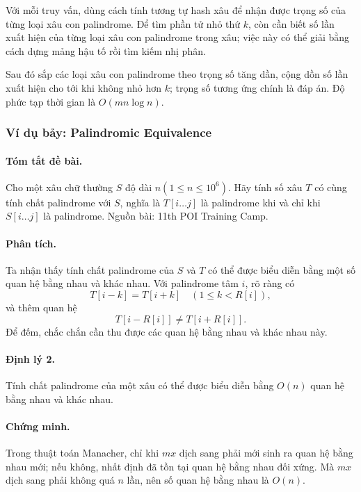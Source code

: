 \documentclass[11pt]{article}
\begin{document}
Với mỗi truy vấn, dùng cách tính tương tự hash xâu để nhận được trọng số của
từng loại xâu con palindrome. Để tìm phần tử nhỏ thứ \(k\), còn cần biết số lần
xuất hiện của từng loại xâu con palindrome trong xâu; việc này có thể giải
bằng cách dựng mảng hậu tố rồi tìm kiếm nhị phân.

Sau đó sắp các loại xâu con palindrome theo trọng số tăng dần, cộng dồn số lần
xuất hiện cho tới khi không nhỏ hơn \(k\); trọng số tương ứng chính là đáp án.
Độ phức tạp thời gian là \(O(mn\log n)\).

\subsubsection{Ví dụ bảy: Palindromic Equivalence}

\paragraph{Tóm tắt đề bài.}
Cho một xâu chữ thường \(S\) độ dài \(n(1\le n\le10^6)\). Hãy tính số xâu \(T\)
có cùng tính chất palindrome với \(S\), nghĩa là \(T[i\ldots j]\) là palindrome
khi và chỉ khi \(S[i\ldots j]\) là palindrome. Nguồn bài: 11th POI Training
Camp.

\paragraph{Phân tích.}
Ta nhận thấy tính chất palindrome của \(S\) và \(T\) có thể được biểu diễn bằng
một số quan hệ bằng nhau và khác nhau. Với palindrome tâm \(i\), rõ ràng có
\[
  T[i-k]=T[i+k]\quad(1\le k<R[i]),
\]
và thêm quan hệ
\[
  T[i-R[i]]\ne T[i+R[i]].
\]
Để đếm, chắc chắn cần thu được các quan hệ bằng nhau và khác nhau này.

\paragraph{Định lý 2.}
Tính chất palindrome của một xâu có thể được biểu diễn bằng \(O(n)\) quan hệ
bằng nhau và khác nhau.

\paragraph{Chứng minh.}
Trong thuật toán Manacher, chỉ khi \(mx\) dịch sang phải mới sinh ra quan hệ
bằng nhau mới; nếu không, nhất định đã tồn tại quan hệ bằng nhau đối xứng. Mà
\(mx\) dịch sang phải không quá \(n\) lần, nên số quan hệ bằng nhau là
\(O(n)\).
\end{document}

